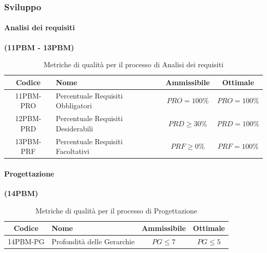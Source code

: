 \documentclass{article}
\begin{document}
\subsubsection{Sviluppo} %
\paragraph{Analisi dei requisiti}%
\textbf{(11PBM - 13PBM)}

\begin{table}[H]
\centering
\renewcommand{\arraystretch}{1.5} %
\begin{tabular}{|c|l|c|c|}
    \hline
    \textbf{Codice} & \textbf{Nome} & \textbf{Ammissibile} & \textbf{Ottimale} \\
    \hline
    11PBM-PRO & Percentuale Requisiti Obbligatori & $PRO = 100\%$ & $PRO = 100\%$ \\
    12PBM-PRD & Percentuale Requisiti Desiderabili & $PRD \geq 30\%$ & $PRD = 100\%$ \\
    13PBM-PRF & Percentuale Requisiti Facoltativi & $PRF \geq 0\%$ & $PRF = 100\%$ \\
    \hline
\end{tabular}
\label{tab:analisi_requisiti}
\caption{Metriche di qualità per il processo di Analisi dei requisiti}
\end{table}
\newpage
\paragraph{Progettazione}%
\textbf{(14PBM)}
\begin{table}[H]
    \centering
    \renewcommand{\arraystretch}{1.5} %
    \begin{tabular}{|c|l|c|c|}
        \hline
        \textbf{Codice} & \textbf{Nome} & \textbf{Ammissibile} & \textbf{Ottimale} \\
        \hline
        14PBM-PG & Profondità delle Gerarchie & $PG \leq 7$ & $PG \leq 5$ \\
        \hline
    \end{tabular}
    \label{tab:progettazione}
    \caption{Metriche di qualità per il processo di Progettazione}
\end{table}
\end{document}
